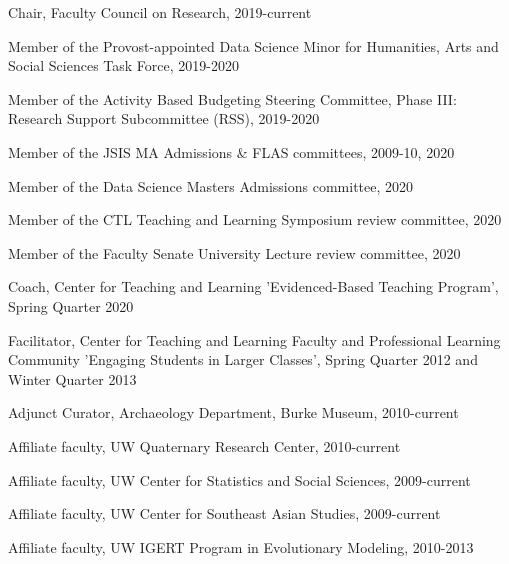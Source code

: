 \ind Chair, Faculty Council on Research, 2019-current

\ind Member of the Provost-appointed Data Science Minor for Humanities, Arts and Social Sciences Task Force, 2019-2020

\ind Member of the Activity Based Budgeting Steering Committee, Phase III:  Research Support Subcommittee (RSS), 2019-2020

\ind Member of the JSIS MA Admissions & FLAS committees, 2009-10, 2020

\ind Member of the Data Science Masters Admissions committee, 2020

\ind Member of the CTL Teaching and Learning Symposium review committee, 2020

\ind Member of the Faculty Senate University Lecture review committee, 2020

\ind Coach, Center for Teaching and Learning 'Evidenced-Based Teaching Program', Spring Quarter 2020

\ind Facilitator, Center for Teaching and Learning Faculty and Professional Learning Community 'Engaging Students in Larger Classes', Spring Quarter 2012 and Winter Quarter 2013

\ind Adjunct Curator, Archaeology Department, Burke Museum, 2010-current

\ind Affiliate faculty, UW Quaternary Research Center, 2010-current

\ind Affiliate faculty, UW Center for Statistics and Social Sciences, 2009-current

\ind Affiliate faculty, UW Center for Southeast Asian Studies, 2009-current

\ind Affiliate faculty, UW IGERT Program in Evolutionary Modeling, 2010-2013


\medskip

